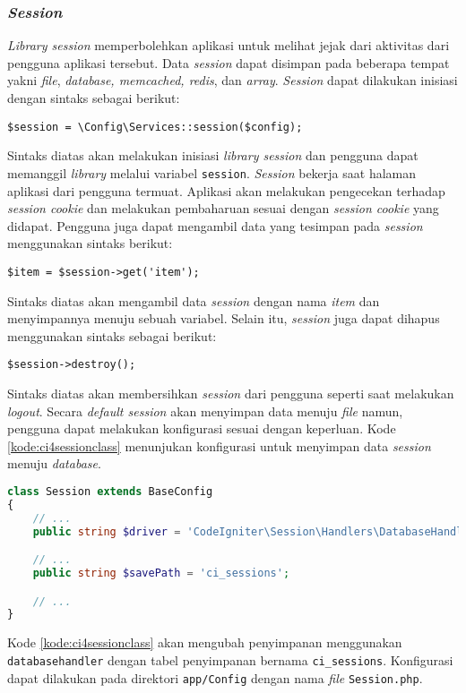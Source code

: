 \subsubsection{\textit{Session}}
\textit{Library session} memperbolehkan aplikasi untuk melihat jejak dari aktivitas dari pengguna aplikasi tersebut. Data \textit{session} dapat disimpan pada beberapa tempat yakni \textit{file}, \textit{database, memcached, redis}, dan \textit{array}. \textit{Session} dapat dilakukan inisiasi dengan sintaks sebagai berikut:
\begin{center}
	\verb|$session = \Config\Services::session($config);|
\end{center}
Sintaks diatas akan melakukan inisiasi \textit{library session} dan pengguna dapat memanggil \textit{library} melalui variabel \texttt{session}. \textit{Session} bekerja saat halaman aplikasi dari pengguna termuat. Aplikasi akan melakukan pengecekan terhadap \textit{session cookie} dan melakukan pembaharuan sesuai dengan \textit{session cookie} yang didapat. Pengguna juga dapat mengambil data yang tesimpan pada \textit{session} menggunakan sintaks berikut:
\begin{center}
	\verb|$item = $session->get('item');|
\end{center}
Sintaks diatas akan mengambil data \textit{session} dengan nama \textit{item} dan menyimpannya menuju sebuah variabel. Selain itu, \textit{session} juga dapat dihapus menggunakan sintaks sebagai berikut:
\begin{center}
	\verb|$session->destroy();|
\end{center}
Sintaks diatas akan membersihkan \textit{session} dari pengguna seperti saat melakukan \textit{logout}. Secara \textit{default session} akan menyimpan data menuju \textit{file} namun, pengguna dapat melakukan konfigurasi sesuai dengan keperluan. Kode \ref{kode:ci4sessionclass} menunjukan konfigurasi untuk menyimpan data \textit{session} menuju \textit{database}.
\begin{lstlisting}[language=PHP, caption=Contoh kode untuk konfigurasi penyimpanan \textit{session}. ,label=kode:ci4sessionclass]
class Session extends BaseConfig
{
    // ...
    public string $driver = 'CodeIgniter\Session\Handlers\DatabaseHandler';

    // ...
    public string $savePath = 'ci_sessions';

    // ...
}
\end{lstlisting}
Kode \ref{kode:ci4sessionclass} akan mengubah penyimpanan menggunakan \texttt{databasehandler} dengan tabel penyimpanan bernama \texttt{ci\_sessions}. Konfigurasi dapat dilakukan pada direktori \texttt{app/Config} dengan nama \textit{file} \texttt{Session.php}.

